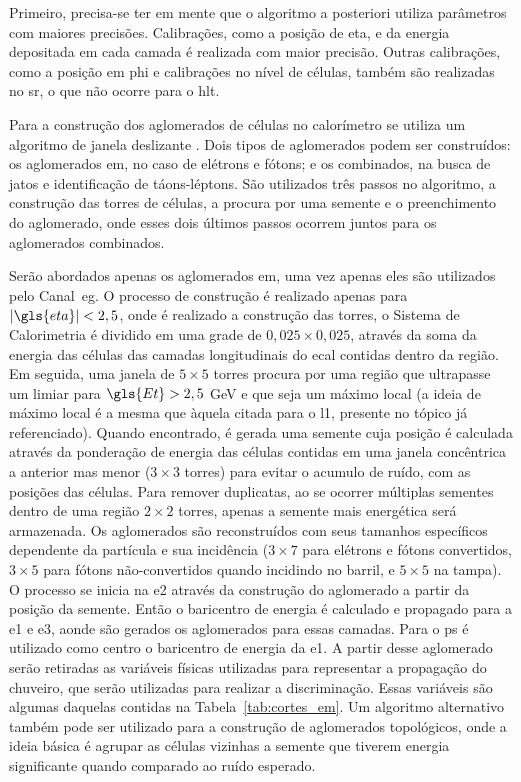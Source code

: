 Primeiro, precisa-se ter em mente que o algoritmo a posteriori utiliza
parâmetros com maiores precisões. Calibrações, como a posição de \gls{eta}, e 
da energia depositada em cada camada é realizada com maior precisão. Outras
calibrações, como a posição em \gls{phi} e calibrações no nível de células,
também são realizadas no \gls{sr}, o que não ocorre para o \gls{hlt}.

Para a construção dos aglomerados de células no calorímetro se utiliza um algoritmo 
de janela deslizante \cite{sliding_window}.
Dois tipos de aglomerados podem ser construídos: os aglomerados \gls{em}, no caso de elétrons e fótons; 
e os combinados, na busca de jatos e identificação de
táons-léptons. São utilizados três passos no algoritmo, a construção das torres de
células, a procura por uma semente e o preenchimento do aglomerado, onde esses dois
últimos passos ocorrem juntos para os aglomerados combinados. 

Serão abordados apenas os aglomerados \gls{em}, uma vez apenas eles são
utilizados pelo Canal~\gls{eg}. O processo de construção é realizado apenas para 
$|\gls{eta}|<2,5$, onde é realizado a construção das torres, o Sistema de Calorimetria é 
dividido em uma grade de $0,025\times0,025$, através da soma da energia das
células das camadas longitudinais do \gls{ecal} contidas dentro da
região. Em seguida, uma janela de $5\times5$ torres
procura por uma região que ultrapasse um limiar para $\gls{Et} > 2,5$ GeV e 
que seja um máximo local (a ideia de máximo local é a mesma que àquela citada
para o \gls{l1}, presente no tópico já referenciado). Quando encontrado, é gerada uma
semente cuja posição é calculada através da ponderação de energia das células contidas 
em uma janela concêntrica a anterior mas menor ($3\times3$ torres) para evitar o
acumulo de ruído, com as posições das células.
Para remover duplicatas, ao se ocorrer múltiplas sementes dentro de uma região
$2\times2$ torres, apenas a semente mais energética será armazenada. Os
aglomerados são reconstruídos com seus tamanhos 
específicos dependente da partícula e sua incidência ($3\times7$ para elétrons e fótons convertidos,
$3\times5$ para fótons não-convertidos quando incidindo no barril, e $5\times5$ na
tampa). O processo se inicia na \gls{e2} através da construção do
aglomerado a partir da posição da semente. Então o baricentro de energia é
calculado e propagado para a \gls{e1} e \gls{e3}, aonde são gerados os
aglomerados para essas camadas. Para o \gls{ps} é utilizado como centro o
baricentro de energia da \gls{e1}. A partir desse aglomerado serão retiradas 
as variáveis físicas utilizadas para representar a propagação do chuveiro, que
serão utilizadas para realizar a discriminação. Essas variáveis são algumas
daquelas contidas na Tabela~\ref{tab:cortes_em}.  
Um algoritmo alternativo também pode ser utilizado para a construção
de aglomerados topológicos, onde a ideia básica é agrupar as células 
vizinhas a semente que tiverem energia significante quando comparado ao ruído
esperado.

